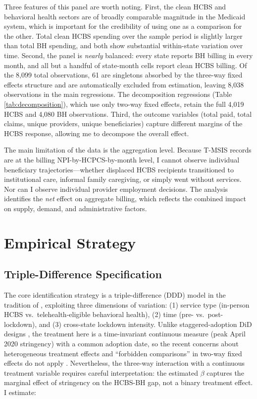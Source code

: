 \documentclass[12pt]{article}
\begin{document}
Three features of this panel are worth noting. First, the clean HCBS and behavioral health sectors are of broadly comparable magnitude in the Medicaid system, which is important for the credibility of using one as a comparison for the other. Total clean HCBS spending over the sample period is slightly larger than total BH spending, and both show substantial within-state variation over time. Second, the panel is \textit{nearly} balanced: every state reports BH billing in every month, and all but a handful of state-month cells report clean HCBS billing. Of the 8,099 total observations, 61 are singletons absorbed by the three-way fixed effects structure and are automatically excluded from estimation, leaving 8,038 observations in the main regressions. The decomposition regressions (Table \ref{tab:decomposition}), which use only two-way fixed effects, retain the full 4,019 HCBS and 4,080 BH observations. Third, the outcome variables (total paid, total claims, unique providers, unique beneficiaries) capture different margins of the HCBS response, allowing me to decompose the overall effect.

The main limitation of the data is the aggregation level. Because T-MSIS records are at the billing NPI-by-HCPCS-by-month level, I cannot observe individual beneficiary trajectories---whether displaced HCBS recipients transitioned to institutional care, informal family caregiving, or simply went without services. Nor can I observe individual provider employment decisions. The analysis identifies the \textit{net} effect on aggregate billing, which reflects the combined impact on supply, demand, and administrative factors.


\section{Empirical Strategy}

\subsection{Triple-Difference Specification}

The core identification strategy is a triple-difference (DDD) model in the tradition of \citet{gruber1994}, exploiting three dimensions of variation: (1) service type (in-person HCBS vs.\ telehealth-eligible behavioral health), (2) time (pre- vs.\ post-lockdown), and (3) cross-state lockdown intensity. Unlike staggered-adoption DiD designs \citep{goodman2021difference, callaway2021, sun2021}, the treatment here is a time-invariant continuous measure (peak April 2020 stringency) with a common adoption date, so the recent concerns about heterogeneous treatment effects and ``forbidden comparisons'' in two-way fixed effects do not apply \citep{dechaisemartin2020two}. Nevertheless, the three-way interaction with a continuous treatment variable requires careful interpretation: the estimated $\beta$ captures the marginal effect of stringency on the HCBS-BH gap, not a binary treatment effect. I estimate:
\end{document}
